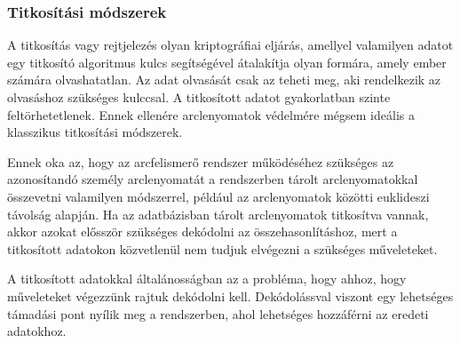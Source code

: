 
\subsubsection{Titkosítási módszerek} %




A titkosítás vagy rejtjelezés olyan kriptográfiai eljárás, amellyel valamilyen adatot egy titkosító algoritmus kulcs segítségével átalakítja olyan formára, amely ember számára olvashatatlan. Az adat olvasását csak az teheti meg, aki rendelkezik az olvasáshoz szükséges kulccsal. A titkosított adatot gyakorlatban szinte feltörhetetlenek. Ennek ellenére arclenyomatok védelmére mégsem ideális a klasszikus titkosítási módszerek. 

Ennek oka az, hogy az arcfelismerő rendszer működéséhez szükséges az azonosítandó személy arclenyomatát a rendszerben tárolt arclenyomatokkal összevetni valamilyen módszerrel, például az arclenyomatok közötti euklideszi távolság alapján. Ha az adatbázisban tárolt arclenyomatok titkosítva vannak, akkor azokat elősször szükséges dekódolni az összehasonlításhoz, mert a titkosított adatokon közvetlenül nem tudjuk elvégezni a szükséges műveleteket. 

A titkosított adatokkal általánosságban az a probléma, hogy ahhoz, hogy műveleteket végezzünk rajtuk dekódolni kell. Dekódolássval viszont egy lehetséges támadási pont nyílik meg a rendszerben, ahol lehetséges hozzáférni az eredeti adatokhoz.

